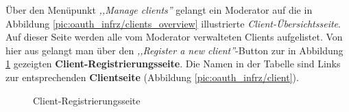 \documentclass[12pt,a4paper,pointednumbers,abstracton]{scrartcl}
\begin{document}
Über den Menüpunkt \emph{,,Manage clients''} gelangt ein Moderator auf die in Abbildung \ref{pic:oauth_infrz/clients_overview} illustrierte \emph{Client-Übersichtsseite}.
Auf dieser Seite werden alle vom Moderator verwalteten Clients aufgelistet.
Von hier aus gelangt man über den \emph{,,Register a new client''}-Button zur in Abbildung \ref{pic:oauth_infrz/client_new} gezeigten \textbf{Client-Registrierungsseite}.
Die Namen in der Tabelle sind Links zur entsprechenden \textbf{Clientseite} (Abbildung \ref{pic:oauth_infrz/client}).

\begin{figure}[h!]
\centering
{}
\caption{Client-Registrierungsseite}
\label{pic:oauth_infrz/client_new}
\end{figure}
\end{document}
